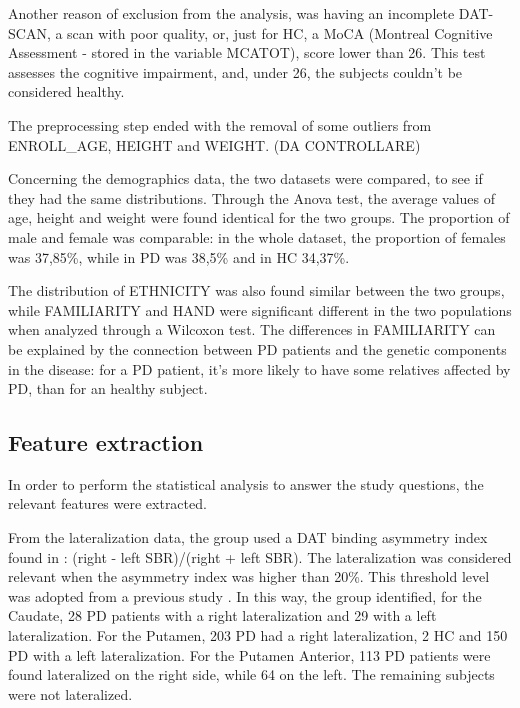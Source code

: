 \documentclass[]{article}
\begin{document}
\begin{multicols}{2}

Another reason of exclusion from the analysis, was having an incomplete DAT-SCAN, a scan with poor quality, or, just for HC, a MoCA (Montreal Cognitive Assessment - stored in the variable MCATOT), score lower than 26. This test assesses the cognitive impairment, and, under 26, the subjects couldn't be considered healthy. 

The preprocessing step ended with the removal of some outliers from ENROLL\_AGE, HEIGHT and WEIGHT. (DA CONTROLLARE)

Concerning the demographics data, the two datasets were compared, to see if they had the same distributions. Through the Anova test, the average values of age, height and weight were found identical for the two groups. The proportion of male and female was comparable: in the whole dataset, the proportion of females was 37,85\%, while in PD was 38,5\% and in HC 34,37\%. 

The distribution of ETHNICITY was also found similar between the two groups, while FAMILIARITY and HAND were significant different in the two populations when analyzed through a Wilcoxon test. The differences in FAMILIARITY can be explained by the connection between PD patients and the genetic components in the disease: for a PD patient, it's more likely to have some relatives affected by PD, than for an healthy subject. 


\subsection{Feature extraction}

In order to perform the statistical analysis to answer the study questions, the relevant features were extracted. 

From the lateralization data, the group used a DAT binding asymmetry index found in \cite{kaasinen_ipsilateral_2016}: (right - left SBR)/(right + left SBR). The lateralization was considered relevant when the asymmetry index was higher than 20\%.
This threshold level was adopted from a previous study \cite{fiorenzato_asymmetric_2021}. In this way, the group identified, for the Caudate,  28 PD patients with a right lateralization and 29 with a left lateralization. For the Putamen, 203 PD had a right lateralization, 2 HC and 150 PD with a left lateralization. For the Putamen Anterior, 113 PD patients were found lateralized on the right side, while 64 on the left. The remaining subjects were not lateralized.


\end{multicols}
\end{document}
